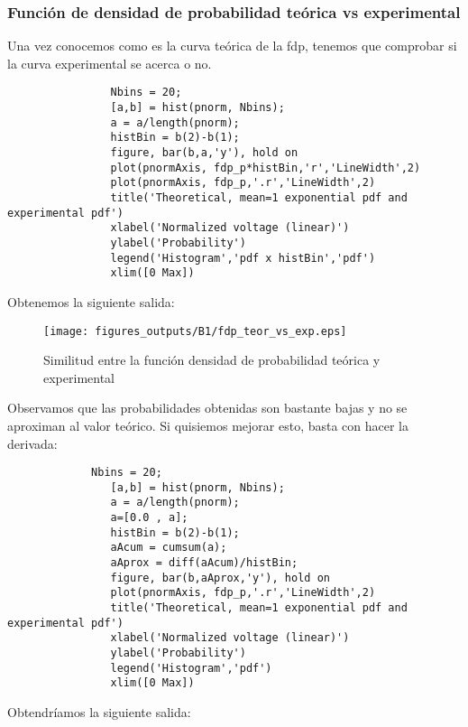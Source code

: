 \documentclass{article}
\begin{document}
        \subsubsection{Función de densidad de probabilidad teórica vs experimental}
            \par Una vez conocemos como es la curva teórica de la fdp, tenemos que comprobar si la curva experimental se acerca o no.
            \begin{lstlisting}
                Nbins = 20; 
                [a,b] = hist(pnorm, Nbins);
                a = a/length(pnorm);
                histBin = b(2)-b(1);
                figure, bar(b,a,'y'), hold on
                plot(pnormAxis, fdp_p*histBin,'r','LineWidth',2)
                plot(pnormAxis, fdp_p,'.r','LineWidth',2)
                title('Theoretical, mean=1 exponential pdf and experimental pdf')
                xlabel('Normalized voltage (linear)')
                ylabel('Probability')
                legend('Histogram','pdf x histBin','pdf')
                xlim([0 Max])
             \end{lstlisting}
             \par Obtenemos la siguiente salida:
        \begin{figure}[h]
            \centering
            \texttt{[image: figures\_outputs/B1/fdp\_teor\_vs\_exp.eps]}
            \caption{Similitud entre la función densidad de probabilidad teórica y experimental}
            \label{fig:fpd_teor_vs_exp_exponential}
        \end{figure}
        \par Observamos que las probabilidades obtenidas son bastante bajas y no se aproximan al valor teórico. Si quisiemos mejorar esto, basta con hacer la derivada:
        \begin{lstlisting}
             Nbins = 20; 
                [a,b] = hist(pnorm, Nbins);
                a = a/length(pnorm);
                a=[0.0 , a];
                histBin = b(2)-b(1);
                aAcum = cumsum(a);
                aAprox = diff(aAcum)/histBin;
                figure, bar(b,aAprox,'y'), hold on
                plot(pnormAxis, fdp_p,'.r','LineWidth',2)
                title('Theoretical, mean=1 exponential pdf and experimental pdf')
                xlabel('Normalized voltage (linear)')
                ylabel('Probability')
                legend('Histogram','pdf')
                xlim([0 Max])
        \end{lstlisting}
        \par Obtendríamos la siguiente salida:
\end{document}

